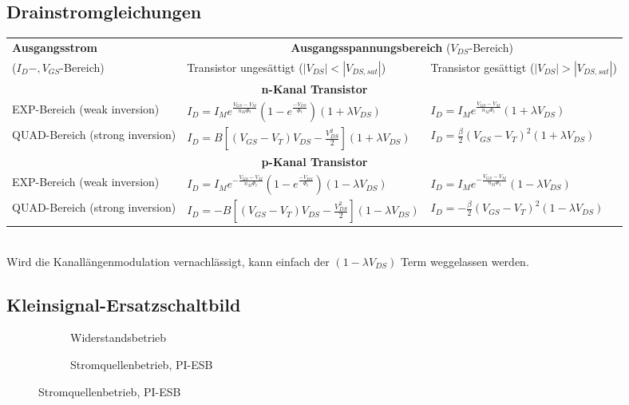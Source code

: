 \subsection{Drainstromgleichungen}
\begin{tabular}{|p{3.8cm}|l|l|}
	\hline
		\textbf{Ausgangsstrom} 
		& \multicolumn{2}{c|}{\textbf{Ausgangsspannungsbereich} ($V_{DS}$-Bereich)}
	\\
		($I_D-, V_{GS}$-Bereich)
		& Transistor ungesättigt ($|V_{DS}| < |V_{DS,sat}|$)
		& Transistor gesättigt ($|V_{DS}| > |V_{DS,sat}|$)
	\\ \hline
		\multicolumn{3}{|c|}{\textbf{n-Kanal Transistor}}
	\\ \hline
		EXP-Bereich \newline (weak inversion)
		& $I_D = I_M e^{\frac{V_{GS}-V_M}{n_M \Phi_t}} (1-e^{\frac{-V_{DS}}{\Phi_t}}) (1 + \lambda V_{DS})$
		& $I_D = I_M e^{\frac{V_{GS}-V_M}{n_M \Phi_t}} (1 + \lambda V_{DS})$
	\\ \hline
		QUAD-Bereich \newline (strong inversion)
		& $I_D = B [(V_{GS} - V_T) V_{DS} - \frac{V_{DS}^2}{2}] (1 + \lambda V_{DS})$
		& $I_D = \frac{\beta}{2}(V_{GS} - V_T)^2 (1 + \lambda V_{DS})$
	\\ \hline
		\multicolumn{3}{|c|}{\textbf{p-Kanal Transistor}}
	\\ \hline
		EXP-Bereich \newline (weak inversion)
		& $I_D = I_M e^{-\frac{V_{GS}-V_M}{n_M \Phi_t}} (1-e^{\frac{-V_{DS}}{\Phi_t}}) (1 - \lambda V_{DS})$
		& $I_D = I_M e^{-\frac{V_{GS}-V_M}{n_M \Phi_t}} (1 - \lambda V_{DS})$
	\\ \hline
		QUAD-Bereich \newline (strong inversion)
		& $I_D = -B [(V_{GS} - V_T) V_{DS} - \frac{V_{DS}^2}{2}] (1 - \lambda V_{DS})$
		& $I_D = -\frac{\beta}{2}(V_{GS} - V_T)^2 (1 - \lambda V_{DS})$
	\\ \hline
\end{tabular} \\

Wird die Kanallängenmodulation vernachlässigt, kann einfach der $(1 - \lambda V_{DS})$ Term weggelassen werden. \\

\subsection{Kleinsignal-Ersatzschaltbild}
\begin{figure}[htbp]
        \centering
        \begin{subfigure}[b]{6cm}
                \centering
                \caption{Widerstandsbetrieb}
        \end{subfigure} \qquad\qquad
        \begin{subfigure}[b]{7cm}
                \centering
                \caption{Stromquellenbetrieb, PI-ESB}
        \end{subfigure}
\end{figure}
